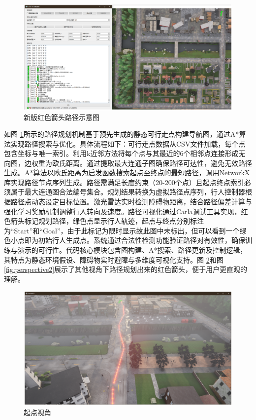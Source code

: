 \begin{figure}[H]
	\centering
	\includegraphics[width=1\textwidth]{images/path_waypoint2.pdf}
	\caption{新版红色箭头路径示意图}
	\label{fig:way2}
\end{figure}

如图 \ref{fig:way2}所示的路径规划机制基于预先生成的静态可行走点构建导航图，通过A*算法实现路径搜索与优化。具体流程如下：可行走点数据从CSV文件加载，每个点包含坐标与唯一索引。利用k近邻方法将每个点与其最近的6个相邻点连接形成无向图，边权重为欧氏距离。通过提取最大连通子图确保路径可达性，避免无效路径生成。A*算法以欧氏距离为启发函数搜索起点至终点的最短路径，调用NetworkX库实现路径节点序列生成。路径需满足长度约束（20-200个点）且起点终点索引必须属于最大连通图合法编号集合。规划结果转换为虚拟路径点序列，行人控制器根据路径点动态设定目标位置。激光雷达实时检测障碍物距离，结合路径偏差计算与强化学习奖励机制调整行人转向及速度。路径可视化通过Carla调试工具实现，红色箭头标记规划路径，绿色点显示行人轨迹，起点与终点分别标注为“Start”和“Goal”，由于此标记为限时显示故此图中未标出，但可以看到一个绿色小点即为初始行人生成点。系统通过合法性检测功能验证路径对有效性，确保训练与演示的可行性。代码核心模块包含图构建、A*搜索、路径更新及控制逻辑，其特点为静态环境假设、障碍物实时避障与多维度可视化支持。图 \ref{fig:perspective1}和图\ref{fig:perspective2}展示了其他视角下路径规划出来的红色箭头，便于用户更直观的理解。

\begin{figure}[H]
	\centering
	\includegraphics[width=1\textwidth]{images/nav_perspective1.pdf}
	\caption{起点视角}
	\label{fig:perspective1}
\end{figure}

